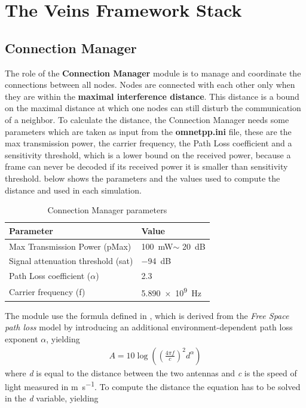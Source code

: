 \section{The Veins Framework Stack}
\subsection{Connection Manager}
The role of the \textbf{Connection Manager} module is to manage and coordinate the connections between all nodes. Nodes are connected with each other only when they are within the \textbf{maximal interference distance}. This distance is a bound on the maximal distance at which one nodes can still disturb the communication of a neighbor. To calculate the distance, the Connection Manager needs some parameters which are taken as input from the \textbf{omnetpp.ini} file, these are the max transmission power, the carrier frequency, the Path Loss coefficient and a sensitivity threshold, which is a lower bound on the received power, because a frame can never be decoded if its received power it is smaller than sensitivity threshold.  below shows the parameters and the values used to compute the distance and used in each simulation.
\begin{table}[H]
    \centering
    {\tabulinesep=1.2mm
    \begin{tabu}{l|l}
        \hline
        Parameter & Value  \\
        \hline
        Max Transmission Power (pMax) & \SI{100}{\mW}$\sim$ \SI{20}{\dB}    \\
        Signal attenuation threshold (sat) & \SI{-94}{\dB} \\
        Path Loss coefficient ($\alpha$)  & 2.3 \\
        Carrier frequency (f)& \SI{5.890e+9}{\Hz} \\
        \hline
    \end{tabu}}
    \caption{Connection Manager parameters}
    \label{tab:param}
\end{table}
The module use the formula defined in \cite{sommer2012applicability}, which is derived from the \emph{Free Space path loss} model by introducing an additional environment-dependent path loss exponent $\alpha$, yielding
\begin{gather}
    A = 10\log\left(\left(\frac{4\pi f}{c}\right)^2 d^{\alpha}\right)
\label{eq:10}
\end{gather}
where \emph{d} is equal to the distance between the two antennas and \emph{c} is the speed of light measured in \si{\meter\per\second}. To compute the distance the equation has to be solved in the \emph{d} variable, yielding

